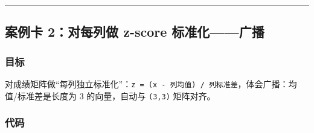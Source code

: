 \begin{center}\rule{0.5\linewidth}{0.5pt}\end{center}

\subsection{案例卡 2：对每列做 z-score
标准化------广播}\label{ux6848ux4f8bux5361-2ux5bf9ux6bcfux5217ux505a-z-score-ux6807ux51c6ux5316ux5e7fux64ad}

\subsubsection{目标}\label{ux76eeux6807-1}

对成绩矩阵做``每列独立标准化''：\texttt{z\ =\ (x\ -\ 列均值)\ /\ 列标准差}，体会广播：均值/标准差是长度为
3 的向量，自动与 \texttt{(3,3)} 矩阵对齐。

\subsubsection{代码}\label{ux4ee3ux7801-1}

\begin{Shaded}
\begin{Highlighting}[]
\OperatorTok{=}\OperatorTok{=}\NormalTok{)}

\OperatorTok{=}\NormalTok{ np.array([}
\NormalTok{    [}\NormalTok{, }\NormalTok{, }\NormalTok{],}
\NormalTok{    [}\NormalTok{, }\NormalTok{, }\NormalTok{],}
\NormalTok{    [}\NormalTok{, }\NormalTok{, }\NormalTok{],}
\NormalTok{])}

\OperatorTok{=}\OperatorTok{=}\NormalTok{)   }
\OperatorTok{=}\OperatorTok{=}\NormalTok{)     }
\OperatorTok{=}\OperatorTok{{-}}\OperatorTok{/}

\NormalTok{(}
\NormalTok{(}
\NormalTok{(}\NormalTok{)}
\end{Highlighting}
\end{Shaded}

